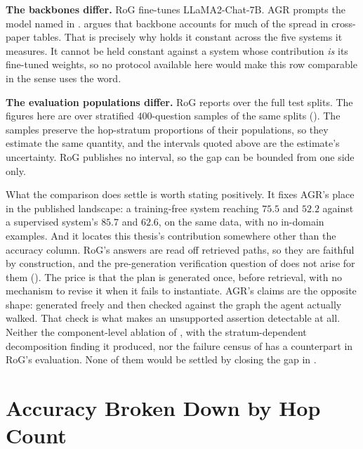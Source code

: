 \textbf{The backbones differ.} RoG fine-tunes LLaMA2-Chat-7B. AGR prompts
the model named in .  argues
that backbone accounts for much of the spread in cross-paper tables. That is
precisely why  holds it constant across the five systems
it measures. It cannot be held constant against a system whose contribution
\emph{is} its fine-tuned weights, so no protocol available here would make
this row comparable in the sense  uses the word.

\textbf{The evaluation populations differ.} RoG reports over the full test
splits. The figures here are over stratified $400$-question samples of the
same splits (). The samples preserve the hop-stratum
proportions of their populations, so they estimate the same quantity, and
the intervals quoted above are the estimate's uncertainty. RoG publishes no
interval, so the gap can be bounded from one side only.

What the comparison does settle is worth stating positively. It fixes AGR's
place in the published landscape: a training-free system reaching $75.5$ and
$52.2$ against a supervised system's $85.7$ and $62.6$, on the same data,
with no in-domain examples. And it locates this thesis's contribution
somewhere other than the accuracy column. RoG's answers are read off
retrieved paths, so they are faithful by construction, and the
pre-generation verification question of  does not
arise for them (). The price is that the plan is
generated once, before retrieval, with no mechanism to revise it when it
fails to instantiate. AGR's claims are the opposite shape: generated freely
and then checked against the graph the agent actually walked. That check is
what makes an unsupported assertion detectable at all. Neither the
component-level ablation of , with the
stratum-dependent decomposition finding it produced, nor the failure census
of  has a counterpart in RoG's evaluation. None
of them would be settled by closing the gap in .

\section{Accuracy Broken Down by Hop Count}\label{sec:hop-results}

